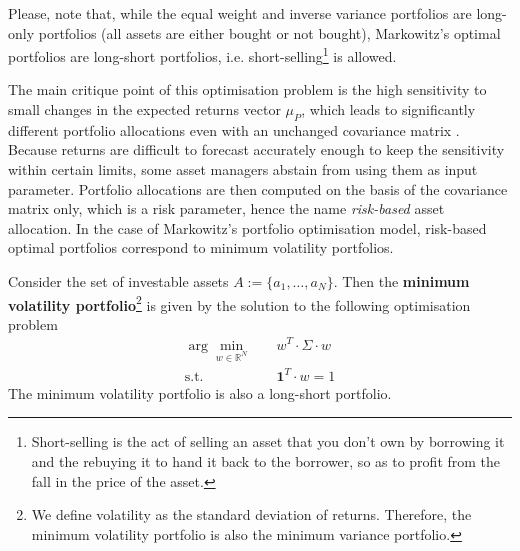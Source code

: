 	Please, note that, while the equal weight and inverse variance portfolios are long-only portfolios (all assets are either bought or not bought), Markowitz's optimal portfolios are long-short portfolios, i.e. short-selling\footnote{Short-selling is the act of selling an asset that you don't own by borrowing it and the rebuying it to hand it back to the borrower, so as to profit from the fall in the price of the asset.} is allowed.
    
    The main critique point of this optimisation problem is the high sensitivity to small changes in the expected returns vector $\mu_P$, which leads to significantly different portfolio allocations even with an unchanged covariance matrix \cite{michaudreturnsstability}. Because returns are difficult to forecast accurately enough to keep the sensitivity within certain limits, some asset managers abstain from using them as input parameter. Portfolio allocations are then computed on the basis of the covariance matrix only, which is a risk parameter, hence the name \textit{risk-based} asset allocation. In the case of Markowitz's portfolio optimisation model, risk-based optimal portfolios correspond to minimum volatility portfolios.
    
    \begin{definition}\label{markowitzlinearsystem}
        Consider the set of investable assets $A := \{ a_1, \dots, a_N \}$. Then the \textbf{minimum volatility portfolio}\footnote{We define volatility as the standard deviation of returns. Therefore, the minimum volatility portfolio is also the minimum variance portfolio.} is given by the solution to the following optimisation problem
        \begin{align*}
            \arg \min_{w \in \mathbb{R}^N}& \quad w^T \cdot \Sigma \cdot w \\
            \text{s.t.}& \quad \mathbf{1}^T \cdot w = 1
        \end{align*}
		The minimum volatility portfolio is also a long-short portfolio.
    \end{definition}
    
    
